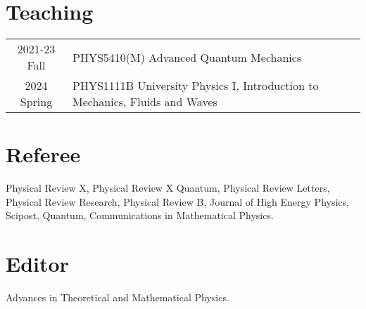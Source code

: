 \documentclass[hidelinks,a4paper]{article}
\begin{document}
\section*{Teaching}
\begin{tabular}{cl}
  2021-23 Fall & PHYS5410(M) Advanced Quantum Mechanics\\
  2024 Spring& PHYS1111B University Physics I, Introduction to Mechanics, Fluids and Waves
\end{tabular}



\section*{Referee}
Physical Review X, Physical Review X Quantum, Physical Review Letters, Physical
Review Research, Physical Review B, Journal of High Energy Physics, Scipost, Quantum, Communications in Mathematical Physics.
\section*{Editor}
Advances in Theoretical and Mathematical Physics.
\end{document}
